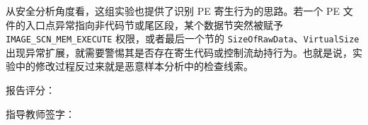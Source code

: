 ﻿\documentclass[12pt]{ctexart}
\begin{document}
从安全分析角度看，这组实验也提供了识别 PE 寄生行为的思路。若一个 PE 文件的入口点异常指向非代码节或尾区段，某个数据节突然被赋予 \texttt{IMAGE\_SCN\_MEM\_EXECUTE} 权限，或者最后一个节的 \texttt{SizeOfRawData}、\texttt{VirtualSize} 出现异常扩展，就需要警惕其是否存在寄生代码或控制流劫持行为。也就是说，实验中的修改过程反过来就是恶意样本分析中的检查线索。


\vspace{1.2cm}

\begin{flushright}
{\heiti{} 报告评分：}\qquad\qquad\qquad\qquad


\vspace{1.2cm}

{\heiti{} 指导教师签字：}\qquad\qquad\qquad

\end{flushright}
\end{document}
